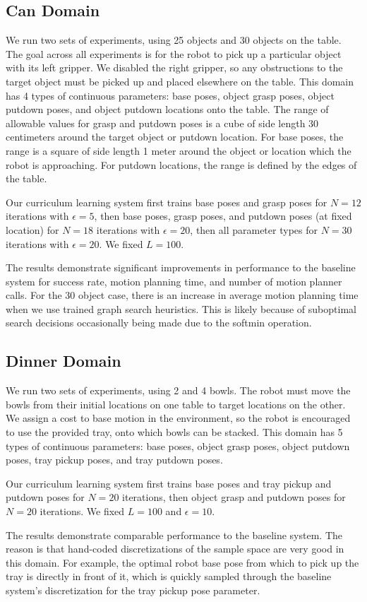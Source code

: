 \subsection{Can Domain}
We run two sets of experiments, using 25 objects and 30 objects on the table.
The goal across all experiments is for the robot to pick up a particular object with its
left gripper. We disabled the right gripper, so any obstructions to the target object must be picked up and
placed elsewhere on the table. This domain has 4 types of continuous parameters: base poses, object grasp
poses, object putdown poses, and object putdown locations onto the table. The range of allowable values for
grasp and putdown poses is a cube of side length 30 centimeters around the target object or putdown
location. For base poses, the range is a square of side length 1 meter around the object or location which
the robot is approaching. For putdown locations, the range is defined by the edges of the table.

Our curriculum learning system first trains base poses and grasp poses for $N = 12$ iterations with $\epsilon = 5$,
then base poses, grasp poses, and putdown poses (at fixed location) for $N = 18$ iterations with $\epsilon = 20$,
then all parameter types for $N = 30$ iterations with $\epsilon = 20$. We fixed $L = 100$.

The results demonstrate significant improvements in performance to the baseline system for success rate, motion planning
time, and number of motion planner calls. For the 30 object case,
there is an increase in average motion planning time when we use trained graph search heuristics. This is likely because of suboptimal
search decisions occasionally being made due to the softmin operation.

\subsection{Dinner Domain}
We run two sets of experiments, using 2 and 4 bowls. The robot must move the
bowls from their initial locations on one table to target locations on the other. We assign a cost to
base motion in the environment, so the robot is encouraged to use the provided tray, onto which bowls can be stacked.
This domain has 5 types of continuous parameters: base poses, object grasp poses, object putdown poses, tray pickup
poses, and tray putdown poses.

Our curriculum learning system first trains base poses and tray pickup and putdown poses for
$N = 20$ iterations, then object grasp and putdown poses for $N = 20$ iterations. We fixed $L = 100$ and $\epsilon = 10$.

The results demonstrate comparable performance to the baseline system. The reason is that
hand-coded discretizations of the sample space are very good in this domain. For example, the optimal
robot base pose from which to pick up the tray is directly in front of it, which is quickly sampled through
the baseline system's discretization for the tray pickup pose parameter.
